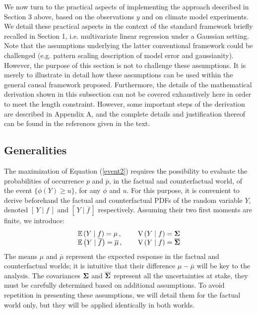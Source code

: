 \documentclass[12pt]{article}
\newcommand{\Sig}{\mbox{\boldmath \(\Sigma\)}}
\newcommand{\Esp}{\mathbb E}
\newcommand{\Var}{\textrm{V}}
\begin{document}
We now turn to the practical aspects of implementing the approach described in Section 3 above, based on the observations $y$ and on climate model experiments. We detail these practical aspects in the context of the standard framework briefly recalled in Section 1, i.e. multivariate linear regression under a Gaussian setting. Note that the assumptions underlying the latter conventional framework could be challenged (e.g. pattern scaling description of model error and gaussianity). However, the purpose of this section is not to challenge these assumptions. It is merely to illustrate in detail how these assumptions can be used within the general causal framework proposed. Furthermore, the details of the mathematical derivation shown in this subsection can not be covered exhaustively here in order to meet the length constraint. However, some important steps of the derivation are described in Appendix A, and the complete details and justification thereof can be found in the references given in the text.

\subsection{Generalities}
The maximization of Equation (\ref{event2}) requires the possibility to evaluate the probabilities of occurrence $p$ and $\overline{p}$, in the factual and counterfactual world, of the event $\{\phi(Y)\geq u\}$, for any $\phi$ and $u$. %
For this purpose, it is convenient to derive beforehand the factual and counterfactual PDFs of the random variable $Y$, denoted $\left[\, Y\mid f\,\right]$ and $\left[\, Y\mid \overline{f}\,\right]$ respectively. Assuming their two first moments are finite, we introduce:
\begin{equation} 
\label{gauss0}
\begin{array}{lll}
\Esp\left(Y\mid f\right) =\mu\,,&\,\,&\Var\left(Y\mid f\right) =\Sig\\
\Esp\left(Y\mid \overline f\right) =\overline{\mu}\,,&\,\,&\Var\left(Y\mid f\right) =\overline{\Sig}\\
\end{array}
\end{equation}
The means $\mu$ and $\overline{\mu}$ represent the expected response in the factual and counterfactual worlds; it is intuitive that their difference $\mu-\overline{\mu}$ will be key to the analysis. The covariances $\Sig$ and $\overline{\Sig}$ represent all the uncertainties at stake, they must be carefully determined based on additional assumptions. To avoid repetition in presenting these assumptions, we will detail them for the factual world only, but they will be applied identically in both worlds.
\end{document}
